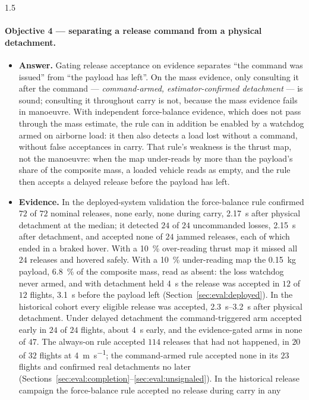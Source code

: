\begin{spacing}{1.5}
\paragraph{Objective 4 --- separating a release command from a physical
detachment.}
\begin{itemize}
\item \textbf{Answer.} Gating release acceptance on evidence separates
``the command was issued'' from ``the payload has left''. On the mass evidence,
only consulting it after the command --- \emph{command-armed,
estimator-confirmed detachment} --- is sound; consulting it throughout carry is
not, because the mass evidence fails in manoeuvre. With independent
force-balance evidence, which does not pass through the mass estimate, the rule
can in addition be enabled by a watchdog armed on airborne load: it then also
detects a load lost without a command, without false acceptances in carry. That
rule's weakness is the thrust map, not the manoeuvre: when the map under-reads by
more than the payload's share of the composite mass, a loaded vehicle reads as
empty, and the rule then accepts a delayed release before the payload has left.
\item \textbf{Evidence.} In the deployed-system validation the force-balance
rule confirmed $72$ of $72$ nominal releases, none early, none during carry,
\SI{2.17}{\second} after physical detachment at the median; it detected $24$ of
$24$ uncommanded losses, \SI{2.15}{\second} after detachment, and accepted none
of $24$ jammed releases, each of which ended in a braked hover. With a
\SI{10}{\percent} over-reading thrust map it missed all $24$ releases and hovered
safely. With a \SI{10}{\percent} under-reading map the \SI{0.15}{\kg} payload,
\SI{6.8}{\percent} of the composite mass, read as absent: the loss watchdog never
armed, and with detachment held \SI{4}{\second} the release was accepted in $12$
of $12$ flights, \SI{3.1}{\second} before the payload left
(Section~\ref{sec:eval:deployed}). In the historical cohort every eligible release was accepted,
\SIrange{2.3}{3.2}{\second} after physical detachment. Under delayed detachment
the command-triggered arm accepted early in $24$ of $24$ flights, about
\SI{4}{\second} early, and the evidence-gated arms in none of $47$. The
always-on rule accepted $114$ releases that had not happened, in $20$ of $32$
flights at \SI{4}{\meter\per\second}; the command-armed rule accepted none in its
$23$ flights and confirmed real detachments no later
(Sections~\ref{sec:eval:completion}--\ref{sec:eval:unsignaled}). In the
historical release campaign the force-balance rule accepted no release during carry in any

\end{itemize}
\end{spacing}
